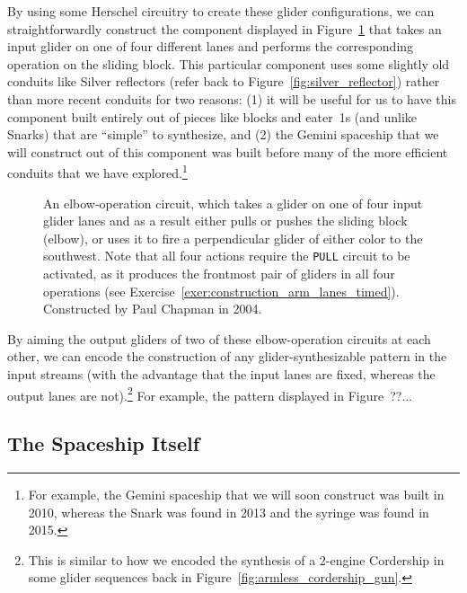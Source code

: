 By using some Herschel circuitry to create these glider configurations, we can straightforwardly construct the component displayed in Figure~\ref{fig:construction_arm} that takes an input glider on one of four different lanes and performs the corresponding operation on  the sliding block. This particular component uses some slightly old conduits like Silver reflectors (refer back to Figure~\ref{fig:silver_reflector}) rather than more recent conduits for two reasons: (1) it will be useful for us to have this component built entirely out of pieces like blocks and eater~1s (and unlike Snarks) that are ``simple'' to synthesize, and (2) the Gemini spaceship that we will construct out of this component was built before many of the more efficient conduits that we have explored.\footnote{For example, the Gemini spaceship that we will soon construct was built in 2010, whereas the Snark was found in 2013 and the syringe was found in 2015.}

\begin{figure}[!htb]
	\centering
	\caption{An elbow-operation circuit, which takes a glider on one of four input glider lanes and as a result either pulls or pushes the sliding block (elbow), or uses it to fire a perpendicular glider of either color to the southwest. Note that all four actions require the \texttt{PULL} circuit to be activated, as it produces the frontmost pair of gliders in all four operations (see Exercise~\ref{exer:construction_arm_lanes_timed}). Constructed by Paul Chapman in 2004.}\label{fig:construction_arm}
\end{figure}

By aiming the output gliders of two of these elbow-operation circuits at each other, we can encode the construction of any glider-synthesizable pattern in the input streams (with the advantage that the input lanes are fixed, whereas the output lanes are not).\footnote{This is similar to how we encoded the synthesis of a $2$-engine Cordership in some glider sequences back in Figure~\ref{fig:armless_cordership_gun}.} For example, the pattern displayed in Figure~??...




\subsection{The Spaceship Itself}\label{sec:gemini_itself}

